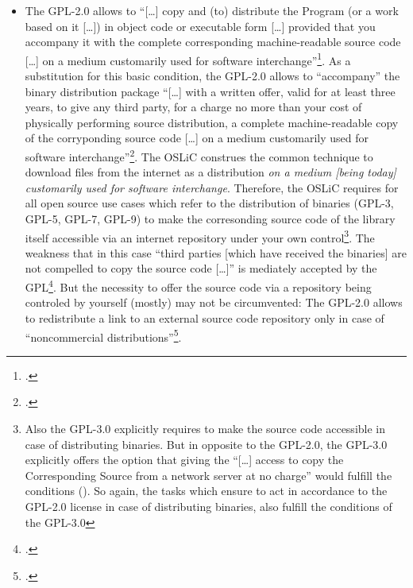 \begin{itemize}
  \item The GPL-2.0 allows to \enquote{[\ldots] copy and (to) distribute the
  Program (or a work based on it [\ldots]) in object code or executable form
  [\ldots] provided that you accompany it with the complete corresponding
  machine-readable source code [\ldots] on a medium customarily used for
  software interchange}\footcite[cf.][\nopage wp.\ §3,
  §3a]{Gpl20OsiLicense1991a}. As a substitution for this basic condition, the
  GPL-2.0 allows to \enquote{accompany} the binary distribution package
  \enquote{[\ldots] with a written offer, valid for at least three years, to
  give any third party, for a charge no more than your cost of physically
  performing source distribution, a complete machine-readable copy of the
  corryponding source code [\ldots] on a medium customarily used for software
  interchange}\footcite[cf.][\nopage wp.\ §3b]{Gpl20OsiLicense1991a}. The OSLiC
  construes the common technique to download files from the internet as a
  distribution \emph{on a medium [being today] customarily used for software
  interchange}. Therefore, the OSLiC requires for all open source use cases
  which refer to the distribution of binaries (GPL-3, GPL-5, GPL-7, GPL-9) to
  make the corresonding source code of the library itself accessible via an
  internet repository under your own control\footnote{\label{Gpl3CondCopyleft}
  Also the GPL-3.0 explicitly requires to make the source code accessible in
  case of distributing binaries. But in opposite to the GPL-2.0, the GPL-3.0
  explicitly offers the option that giving the \enquote{[\ldots] access to copy
  the Corresponding Source from a network server at no charge} would fulfill the
  conditions (\cite[cf.][\nopage wp.\ §6 and §6b]{Gpl30OsiLicense2007a}). So
  again, the tasks which ensure to act in accordance to the GPL-2.0 license in
  case of distributing binaries, also fulfill the conditions of the GPL-3.0}.
  The weakness that in this case \enquote{third parties [which have received the
  binaries] are not compelled to copy the source code [\ldots]} is mediately
  accepted by the GPL\footcite[cf.][\nopage wp.\ §3, at the
  end]{Gpl20OsiLicense1991a}. But the necessity to offer the source code via a
  repository being controled by yourself (mostly) may not be circumvented: The
  GPL-2.0 allows to redistribute a link to an external source code repository
  only in case of \enquote{noncommercial distributions}\footcite[cf.][\nopage
  wp.\ §3c]{Gpl20OsiLicense1991a}.
  

\end{itemize}
